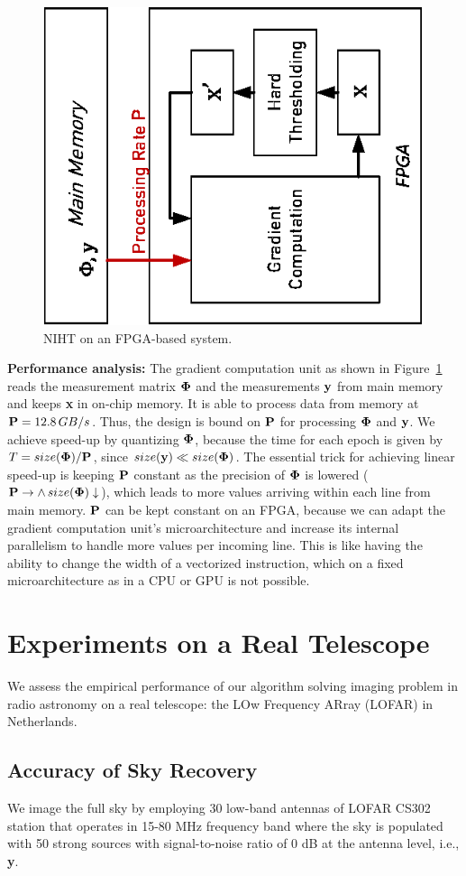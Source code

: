 \documentclass{article}
\begin{document}
\begin{figure}[h!]
\centering
\includegraphics[width=0.5\columnwidth, angle=270]{figs/niht_fpga.eps}
\caption{NIHT on an FPGA-based system.}
\label{fig:fpga}
\end{figure}


{\bf Performance analysis:} The gradient computation unit as shown in Figure~\ref{fig:fpga} reads the measurement matrix ${\bf \Phi}$ and the measurements ${\bf y}$ from main memory and keeps {\bf x} in on-chip memory. It is able to process data from memory at ${\bf P}=12.8\,GB/s$. Thus, the design is bound on ${\bf P}$ for processing ${\bf \Phi}$ and ${\bf y}$. We achieve speed-up by quantizing ${\bf \Phi}$, because the time for each epoch is given by
$T = size({\bf \Phi})/{\bf P}$, since $size({\bf y}) \ll size({\bf \Phi})$. The essential trick for achieving linear speed-up is keeping ${\bf P}$ constant as the precision of ${\bf \Phi}$ is lowered (${\bf P}\to \land \, size({\bf \Phi})\downarrow$), which leads to more values arriving within each line from main memory. ${\bf P}$ can be kept constant on an FPGA, because we can adapt the gradient computation unit's microarchitecture and increase its internal parallelism to handle more values per incoming line. This is like having the ability to change the width of a vectorized instruction, which on a fixed microarchitecture as in a CPU or GPU is not possible.



\newpage

\section{Experiments on a Real Telescope}
We assess the empirical performance of our algorithm solving imaging problem in radio astronomy on a real telescope: the LOw Frequency ARray (LOFAR) in Netherlands.
\subsection{Accuracy of Sky Recovery}
We image the full sky by employing 30 low-band antennas of LOFAR CS302 station that operates in 15-80 MHz frequency band where the sky is populated with 50 strong sources with signal-to-noise ratio of 0 dB at the antenna level, i.e., {\bf y}. 
\end{document}
